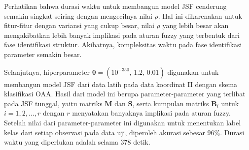\noindent Perhatikan bahwa durasi waktu untuk membangun model JSF cenderung semakin singkat seiring dengan mengecilnya nilai $\rho$. Hal ini dikarenakan untuk fitur-fitur dengan variansi yang cukup besar, nilai $\rho$ yang lebih besar akan mengakibatkan lebih banyak implikasi pada aturan fuzzy yang terbentuk dari fase identifikasi struktur. Akibatnya, kompleksitas waktu pada fase identifikasi parameter semakin besar.

\noindent Selanjutnya, hiperparameter $\boldsymbol{\theta} = (10^{-350}\text{, }\allowbreak \num{1,2} \text{, } \allowbreak \num{0,01})$ digunakan untuk membangun model JSF dari data latih pada data koordinat II dengan skema klasifikasi OAA. Hasil dari model ini berupa parameter-parameter yang terlibat pada JSF tunggal, yaitu matriks $\mathbf{M}$ dan $\mathbf{S}$, serta kumpulan matriks $\mathbf{B}_i$ untuk $i=1,2,\ldots,r$ dengan $r$ menyatakan banyaknya implikasi pada aturan fuzzy. Setelah nilai dari parameter-parameter ini digunakan untuk menentukan label kelas dari setiap observasi pada data uji, diperoleh akurasi sebesar $96\%$. Durasi waktu yang diperlukan adalah selama $378$ detik.

